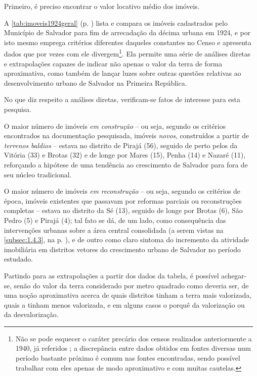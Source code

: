 Primeiro, é preciso encontrar o valor locativo médio dos imóveis. 

A \autoref{tab:imoveis1924geral} (p. \pageref{tab:imoveis1924geral}) lista e compara os imóveis cadastrados pelo Município de Salvador para fim de arrecadação da décima urbana em 1924, e por isto mesmo emprega critérios diferentes daqueles constantes no Censo e apresenta dados que por vezes com ele divergem\footnote{Não se pode esquecer o caráter precário dos censos realizados anteriormente a 1940, já referidos \cite{oliveirasimoes_censos_2005, reisetal_areascensos_2011}; a discrepância entre dados obtidos em fontes diversas num período bastante próximo é comum nas fontes encontradas, sendo possível trabalhar com eles apenas de modo aproximativo e com muitas cautelas.}. Ela permite uma série de análises diretas e extrapolações capazes de indicar não apenas o valor da terra de forma aproximativa, como também de lançar luzes sobre outras questões relativas ao desenvolvimento urbano de Salvador na Primeira República.



No que diz respeito a análises diretas, verificam-se fatos de interesse para esta pesquisa.

O maior número de imóveis \textit{em construção} -- ou seja, segundo os critérios encontrados na documentação pesquisada, imóveis \textit{novos}, construídos a partir de \textit{terrenos baldios} -- estava no distrito de Pirajá (56), seguido de perto pelos da Vitória (33) e Brotas (32) e de longe por Mares (15), Penha (14) e Nazaré (11), reforçando a hipótese de uma tendência ao crescimento de Salvador para fora de seu núcleo tradicional.

O maior número de imóveis \textit{em reconstrução} -- ou seja, segundo os critérios de época, imóveis existentes que passavam por reformas parciais ou reconstruções completas -- estava no distrito da Sé (13), seguido de longe por Brotas (6), São Pedro (5) e Pirajá (4); tal fato se dá, de um lado, como consequência das intervenções urbanas sobre a área central consolidada (a serem vistas na \autoref{subsec:1.4.3}, na p. \pageref{subsec:1.4.3}), e de outro como claro sintoma do incremento da atividade imobiliária em distritos vetores do crescimento urbano de Salvador no período estudado.

Partindo para as extrapolações a partir dos dados da tabela, é possível achegar-se, senão do valor da terra considerado por metro quadrado como deveria ser, de uma noção aproximativa acerca de quais distritos tinham a terra mais valorizada, quais a tinham menos valorizada, e em alguns casos o porquê da valorização ou da desvalorização.

